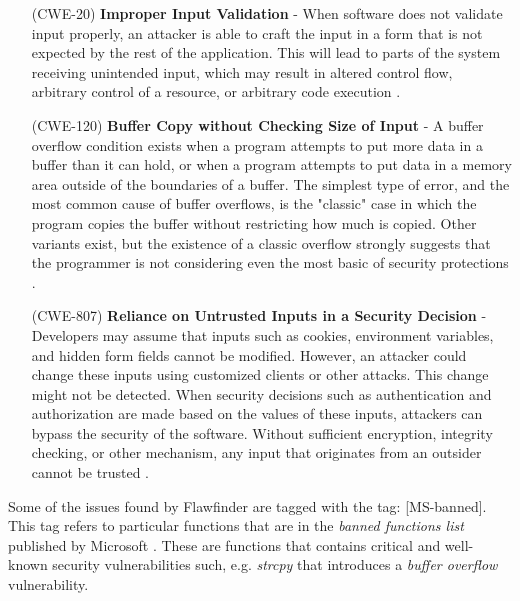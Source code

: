 \begin{itemize}
	\item[(CWE-20) ] \textbf{Improper Input Validation} - When software does not validate input properly, an attacker is able to craft the input in a form that is not expected by the rest of the application. This will lead to parts of the system receiving unintended input, which may result in altered control flow, arbitrary control of a resource, or arbitrary code execution \cite{bibitem7}.
	\item[(CWE-120) ] \textbf{Buffer Copy without Checking Size of Input} - A buffer overflow condition exists when a program attempts to put more data in a buffer than it can hold, or when a program attempts to put data in a memory area outside of the boundaries of a buffer. The simplest type of error, and the most common cause of buffer overflows, is the "classic" case in which the program copies the buffer without restricting how much is copied. Other variants exist, but the existence of a classic overflow strongly suggests that the programmer is not considering even the most basic of security protections \cite{bibitem8}.
	\item[(CWE-807) ] \textbf{Reliance on Untrusted Inputs in a Security Decision} - Developers may assume that inputs such as cookies, environment variables, and hidden form fields cannot be modified. However, an attacker could change these inputs using customized clients or other attacks. This change might not be detected. When security decisions such as authentication and authorization are made based on the values of these inputs, attackers can bypass the security of the software.\newline
Without sufficient encryption, integrity checking, or other mechanism, any input that originates from an outsider cannot be trusted \cite{bibitem9}.
\end{itemize}

Some of the issues found by Flawfinder are tagged with the tag: [MS-banned]. This tag refers to particular functions that are in the \textsl{banned functions list} published by Microsoft \cite{bibitem10}. These are functions that contains critical and well-known security vulnerabilities such, e.g. \textsl{strcpy} that introduces a \textsl{buffer overflow} vulnerability.\newline\newline

